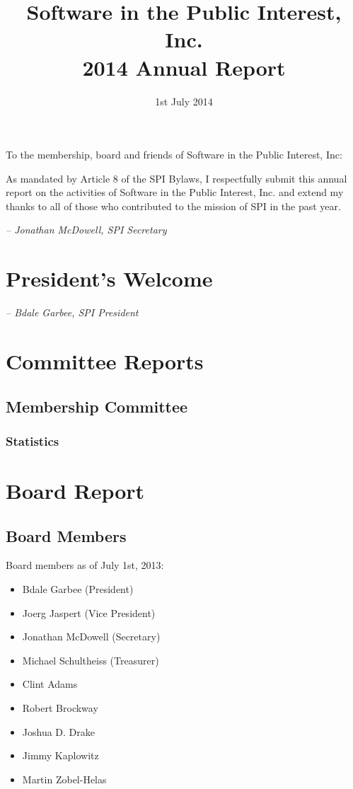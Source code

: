 \documentclass[letterpaper]{report}
\begin{document}
\title{Software in the Public Interest, Inc.\\
2014 Annual Report}
\date{1st July 2014}

\maketitle

To the membership, board and friends of Software in the Public Interest, Inc:

As mandated by Article 8 of the SPI Bylaws, I respectfully submit this annual
report on the activities of Software in the Public Interest, Inc. and extend my
thanks to all of those who contributed to the mission of SPI in the past year.

  \emph{-- Jonathan McDowell, SPI Secretary}

\newpage

\tableofcontents

\newpage

\chapter{President's Welcome}
\label{sec:president}

  \emph{-- Bdale Garbee, SPI President}

\chapter{Committee Reports}
\section{Membership Committee}

\subsection{Statistics}

\chapter{Board Report}
\section{Board Members}

Board members as of July 1st, 2013:

\begin{itemize}
\item Bdale Garbee (President)
\item Joerg Jaspert (Vice President)
\item Jonathan McDowell (Secretary)
\item Michael Schultheiss (Treasurer)
\item Clint Adams
\item Robert Brockway
\item Joshua D. Drake
\item Jimmy Kaplowitz
\item Martin Zobel-Helas
\end{itemize}
\end{document}
